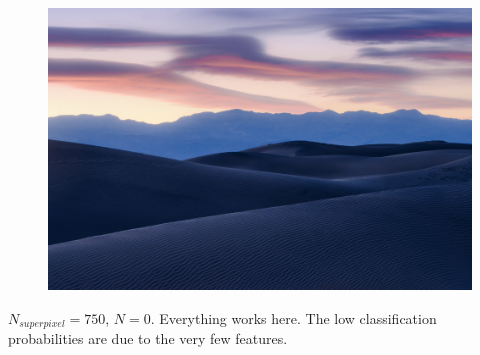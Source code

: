 \documentclass[a4paper,titlepaget]{article}
\begin{document}
\begin{figure}[htpb]
	\centering
	\includegraphics[width=.9\textwidth]{images/results/9fin}
\end{figure}
$N_{superpixel}=750$, $N=0$. Everything works here. The low classification probabilities are due to the very few features.
\newpage
\end{document}
